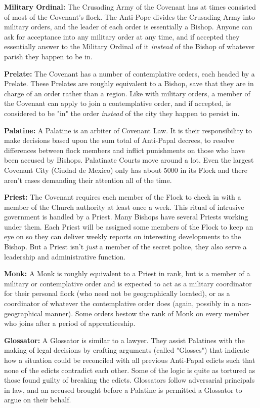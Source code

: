 \textbf{Military Ordinal:} The Crusading Army of the Covenant has at times consisted of most of the Covenant's flock. The Anti-Pope divides the Crusading Army into military orders, and the leader of each order is essentially a Bishop. Anyone can ask for acceptance into any military order at any time, and if accepted they essentially answer to the Military Ordinal of it \textit{instead} of the Bishop of whatever parish they happen to be in.

\textbf{Prelate:} The Covenant has a number of contemplative orders, each headed by a Prelate. These Prelates are roughly equivalent to a Bishop, save that they are in charge of an order rather than a region. Like with military orders, a member of the Covenant can apply to join a contemplative order, and if accepted, is considered to be "in" the order \textit{instead} of the city they happen to persist in.

\textbf{Palatine:} A Palatine is an arbiter of Covenant Law. It is their responsibility to make decisions based upon the sum total of Anti-Papal decrees, to resolve differences between flock members and inflict punishments on those who have been accused by Bishops. Palatinate Courts move around a lot. Even the largest Covenant City (Ciudad de Mexico) only has about 5000 in its Flock and there aren't cases demanding their attention all of the time.

\textbf{Priest:} The Covenant requires each member of the Flock to check in with a member of the Church authority at least once a week. This ritual of intrusive government is handled by a Priest. Many Bishops have several Priests working under them. Each Priest will be assigned some members of the Flock to keep an eye on so they can deliver weekly reports on interesting developments to the Bishop. But a Priest isn't \textit{just} a member of the secret police, they also serve a leadership and administrative function.

\textbf{Monk:} A Monk is roughly equivalent to a Priest in rank, but is a member of a military or contemplative order and is expected to act as a military coordinator for their personal flock (who need not be geographically located), or as a coordinator of whatever the contemplative order does (again, possibly in a non-geographical manner). Some orders bestow the rank of Monk on every member who joins after a period of apprenticeship.

\textbf{Glossator:} A Glossator is similar to a lawyer. They assist Palatines with the making of legal decisions by crafting arguments (called "Glosses") that indicate how a situation could be reconciled with all previous Anti-Papal edicts such that none of the edicts contradict each other. Some of the logic is quite as tortured as those found guilty of breaking the edicts. Glossators follow adversarial principals in law, and an accused brought before a Palatine is permitted a Glossator to argue on their behalf.

